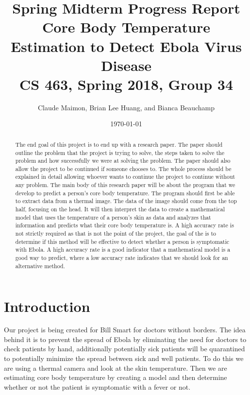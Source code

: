 \documentclass[onecolumn, draftclsnofoot,10pt, compsoc]{IEEEtran}
\title{%
  Spring Midterm Progress Report \\
  \vspace{0.4cm}
  \large Core Body Temperature Estimation to Detect Ebola Virus Disease \\
  \vspace{0.4cm}
  \large CS 463, Spring 2018, Group 34\\
    }
\author{Claude Maimon, Brian Lee Huang, and Bianca Beauchamp}
\date{\today}
\begin{document}
\maketitle
\begin{abstract}
	The end goal of this project is to end up with a research paper. The paper should outline the problem that the project is trying to solve, the steps taken to solve the problem and how successfully we were
	at solving the problem. The paper should also allow the project to be continued if someone chooses to. The whole process should be explained in detail allowing whoever wants to continue the
	project to continue without any problem. The main body of this research paper will be about the program that we develop to predict a person's core body temperature. The program should first be able to
	extract data from a thermal image. The data of the image should come from the top half, focusing on the head. It will then interpret the data to create a mathematical model that uses the temperature of a 
	person's skin as data and analyzes that information and predicts what their core body temperature is. A high accuracy rate is not strictly required as that is not the point of the project, 
	the goal of the is to determine if this method will be effective to detect whether a person is symptomatic with Ebola. A high accuracy rate is a good indicator that a mathematical model
	is a good way to predict, where a low accuracy rate indicates that we should look for an alternative method.
\end{abstract}



\newpage

\tableofcontents
\newpage

\section{Introduction}

Our project is being created for Bill Smart for doctors without borders. The idea behind it is to prevent the spread of Ebola by eliminating the need for doctors to check patients by hand, additionally potentially sick patients will be quarantined to potentially minimize the spread between sick and well patients.
To do this we are using a thermal camera and look at the skin temperature. Then we are estimating core body temperature by creating a model and then determine whether or not the patient is symptomatic with a fever or not.
\end{document}
